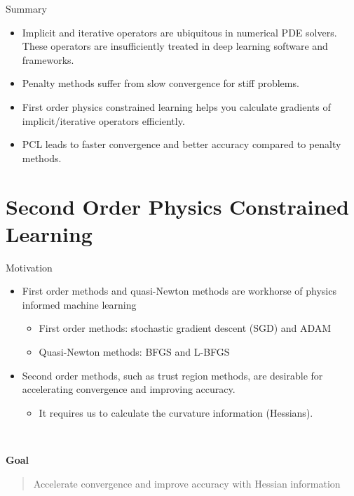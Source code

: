 \documentclass[usenames,dvipsnames]{beamer}
\begin{document}
\begin{frame}{Summary}
\begin{itemize}
\item Implicit and iterative operators are ubiquitous in numerical PDE solvers. These operators are insufficiently treated in deep learning software and frameworks.

\item Penalty methods suffer from slow convergence for stiff problems. 

\item First order physics constrained learning helps you calculate gradients of implicit/iterative operators efficiently. 

\item PCL leads to faster convergence and better accuracy compared to penalty methods.
\end{itemize}
\end{frame}

\section{Second Order Physics Constrained Learning}

\begin{frame}{Motivation}

\begin{itemize}
	\item First order methods and quasi-Newton methods are workhorse of physics informed machine learning 
	
	\begin{itemize}
		\item First order methods: stochastic gradient descent (SGD) and ADAM 
		\item Quasi-Newton methods: BFGS and L-BFGS 
	\end{itemize}

	\item Second order methods, such as trust region methods, are desirable for accelerating convergence and improving accuracy. 
	\begin{itemize}
		\item It requires us to calculate the curvature information (Hessians).
	\end{itemize}
\end{itemize}

\

\textbf{Goal}

\vspace{0.2cm} 

\begin{quote}
	Accelerate convergence and improve accuracy with Hessian information
\end{quote}

\end{frame}
\end{document}
